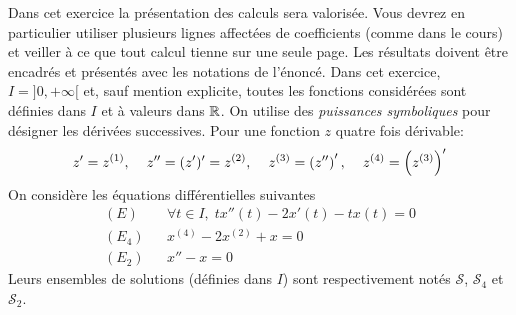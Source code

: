 Dans cet exercice la présentation des calculs sera valorisée. Vous devrez en particulier utiliser plusieurs lignes affectées de coefficients (comme dans le cours) et veiller à ce que tout calcul tienne sur une seule page.\newline
Les résultats doivent être encadrés et présentés avec les notations de l'énoncé.\newline
Dans cet exercice, $I= ]0, + \infty[$ et, sauf mention explicite, toutes les fonctions considérées sont définies dans $I$ et à valeurs dans $\mathbb{R}$. On utilise des \emph{puissances symboliques} pour désigner les dérivées successives. Pour une fonction $z$ quatre fois dérivable:
\begin{displaymath}
  z' = z^{(1)}, \hspace{0.4cm} z'' = (z')' = z^{(2)},\hspace{0.4cm} z^{(3)} = \left( z''\right)', \hspace{0.4cm} z^{(4)} = \left( z^{(3)}\right)'  
\end{displaymath}
On considère les équations différentielles suivantes
\begin{align*}
  (E)& & \forall t \in I,\; tx''(t) - 2x'(t) -tx(t) = 0 \\
  (E_4)& & x^{(4)} -2 x^{(2)} + x = 0 \\
  (E_2)& & x'' -x = 0
\end{align*}
Leurs ensembles de solutions (définies dans $I$) sont respectivement notés $\mathcal{S}$, $\mathcal{S}_4$ et $\mathcal{S}_2$. 
